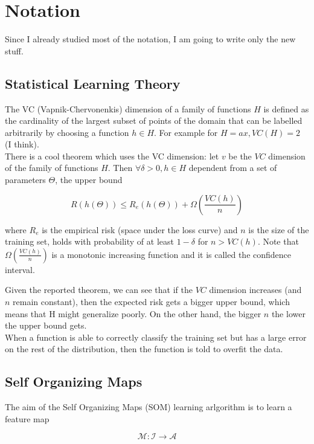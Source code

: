 \section{Notation}

Since I already studied most of the notation, I am going to write only the new
stuff.

\subsection{Statistical Learning Theory}

The VC (Vapnik-Chervonenkis) dimension of a family of functions $H$ is defined as
the cardinality of the largest subset of points of the domain that can be
labelled arbitrarily by choosing a function $h \in H$.
For example for $H = ax, VC(H) = 2$ (I think).\\
There is a cool theorem which uses the VC dimension: let $v$ be the $VC$
dimension of the family of functions $H$. Then $\forall \delta > 0, h \in H$
dependent from a set of parameters $\Theta$, the upper bound

\begin{equation}
	R(h(\Theta)) \leq R_e(h(\Theta)) + \Omega\left(\frac{VC(h)}{n}\right)
\end{equation}

where $R_e$ is the empirical risk (space under the loss curve) and $n$ is the
size of the training set, holds with probability of at least $1-\delta$ for 
$n > VC(h)$. Note that $\Omega\left(\frac{VC(h)}{n}\right)$ is a monotonic
increasing function and it is called the confidence interval.

Given the reported theorem, we can see that if the $VC$ dimension increases (and
$n$ remain constant), then the expected risk gets a bigger upper bound, which
means that H might generalize poorly. 
On the other hand, the bigger $n$ the lower the upper bound gets.\\
When a function is able to correctly classify the training set but has a large
error on the rest of the distribution, then the function is told to overfit the
data.

\subsection{Self Organizing Maps}

The aim of the Self Organizing Maps (SOM) learning arlgorithm is to learn a
feature map 

\begin{equation}
	\label{som_eq}
	\mathcal{M}: \mathcal{I} \rightarrow \mathcal{A}
\end{equation}

